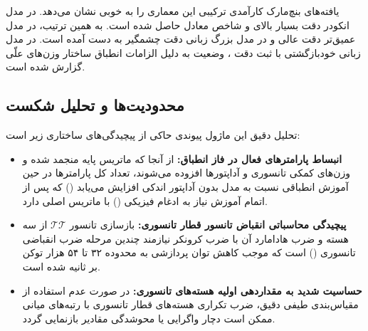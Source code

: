 یافته‌های بنچ‌مارک کارآمدی ترکیبی این معماری را به خوبی نشان می‌دهد. در مدل انکودر  دقت بسیار بالای  و شاخص  معادل  حاصل شده است. به همین ترتیب، در مدل عمیق‌تر  دقت عالی  و در مدل بزرگ زبانی  دقت چشمگیر  به دست آمده است. در مدل زبانی خودبازگشتی  با ثبت دقت ، وضعیت  به دلیل الزامات انطباق ساختار وزن‌های علّی گزارش شده است.

\subsection{محدودیت‌ها و تحلیل شکست}
تحلیل دقیق این ماژول پیوندی حاکی از پیچیدگی‌های ساختاری زیر است:
\begin{itemize}
    \item \textbf{انبساط پارامترهای فعال در فاز انطباق:} از آنجا که ماتریس پایه منجمد شده و وزن‌های کمکی تانسوری و آداپتورها افزوده می‌شوند، تعداد کل پارامترها در حین آموزش انطباقی نسبت به مدل بدون آداپتور اندکی افزایش می‌یابد () که پس از اتمام آموزش نیاز به ادغام فیزیکی () با ماتریس اصلی دارد.
    \item \textbf{پیچیدگی محاسباتی انقباض تانسور قطار تانسوری:} بازسازی تانسور $\mathcal{TT}$ از سه هسته و ضرب هادامارد آن با ضرب کرونکر نیازمند چندین مرحله ضرب انقباضی تانسوری () است که موجب کاهش توان پردازشی به محدوده ۳۲ تا ۵۴ هزار توکن بر ثانیه شده است.
    \item \textbf{حساسیت شدید به مقداردهی اولیه هسته‌های تانسوری:} در صورت عدم استفاده از مقیاس‌بندی طیفی دقیق، ضرب تکراری هسته‌های قطار تانسوری با رتبه‌های میانی ممکن است دچار واگرایی یا محوشدگی مقادیر بازنمایی گردد.
\end{itemize}
